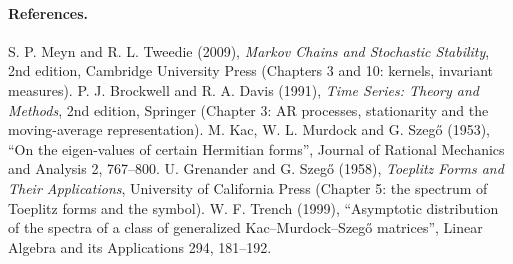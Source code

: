 \paragraph{References.}
S. P. Meyn and R. L. Tweedie (2009), \emph{Markov Chains and Stochastic Stability},
2nd edition, Cambridge University Press (Chapters 3 and 10: kernels, invariant
measures).
P. J. Brockwell and R. A. Davis (1991), \emph{Time Series: Theory and Methods},
2nd edition, Springer (Chapter 3: AR processes, stationarity and the moving-average
representation).
M. Kac, W. L. Murdock and G. Szeg\H{o} (1953), ``On the eigen-values of certain Hermitian
forms'', Journal of Rational Mechanics and Analysis 2, 767--800.
U. Grenander and G. Szeg\H{o} (1958), \emph{Toeplitz Forms and Their Applications},
University of California Press (Chapter 5: the spectrum of Toeplitz forms and the
symbol).
W. F. Trench (1999), ``Asymptotic distribution of the spectra of a class of generalized
Kac--Murdock--Szeg\H{o} matrices'', Linear Algebra and its Applications 294, 181--192.
